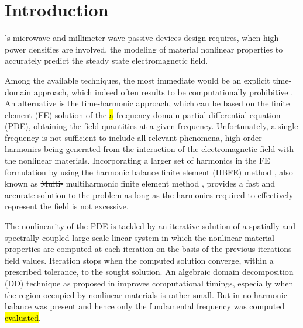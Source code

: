 \documentclass[journal]{IEEEtran}
\begin{document}
%
\IEEEpeerreviewmaketitle



\section{Introduction}


's microwave and millimeter wave passive devices design
requires, when high power densities are involved, the modeling of material
nonlinear properties to accurately predict the steady state electromagnetic field.

Among the available techniques, the most immediate would be an explicit
time-domain approach, which indeed often results to be computationally
prohibitive \cite{deGersem2001}. An alternative is the time-harmonic approach,
which can be based on the finite element (FE) solution of \st{the} \hl{a} frequency domain
partial differential equation (PDE), obtaining the field quantities at a given
frequency. Unfortunately, a single frequency is not sufficient to include all
relevant phenomena, high order harmonics being generated from the interaction
of the electromagnetic field with the nonlinear materials. Incorporating a
larger set of harmonics in the FE formulation by using the harmonic balance
finite element (HBFE) method \cite{Yamada1988,Yamada1989}, also known as \st{Multi-}
multiharmonic finite element method \cite{Copeland2010, Bachinger2005, Kolmbauer2009}, 
provides a fast and accurate solution to the problem as long as the harmonics 
required to effectively represent the field is not excessive. 

The nonlinearity of the PDE is tackled by an iterative solution of a spatially
and spectrally coupled large-scale linear system in which the nonlinear material
properties are computed at each iteration on the basis of the previous
iterations field values. Iteration stops when the computed solution converge,
within a prescribed tolerance, to the sought solution.
An algebraic domain decomposition (DD) technique as proposed in \cite{Guarnieri2010}
improves computational timings, especially when the region occupied by
nonlinear materials is rather small. But in \cite{Guarnieri2010} no harmonic
balance was present and hence only the fundamental frequency was \st{computed}
\hl{evaluated}.
\end{document}
